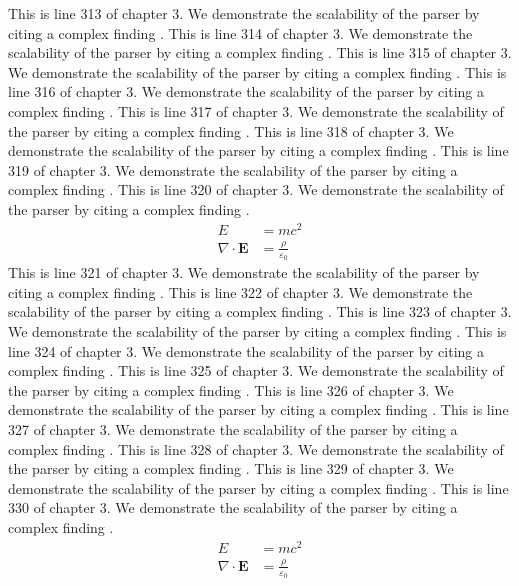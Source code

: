 This is line 313 of chapter 3. We demonstrate the scalability of the parser by citing a complex finding \cite{ref3_313}.
This is line 314 of chapter 3. We demonstrate the scalability of the parser by citing a complex finding \cite{ref3_314}.
This is line 315 of chapter 3. We demonstrate the scalability of the parser by citing a complex finding \cite{ref3_315}.
This is line 316 of chapter 3. We demonstrate the scalability of the parser by citing a complex finding \cite{ref3_316}.
This is line 317 of chapter 3. We demonstrate the scalability of the parser by citing a complex finding \cite{ref3_317}.
This is line 318 of chapter 3. We demonstrate the scalability of the parser by citing a complex finding \cite{ref3_318}.
This is line 319 of chapter 3. We demonstrate the scalability of the parser by citing a complex finding \cite{ref3_319}.
This is line 320 of chapter 3. We demonstrate the scalability of the parser by citing a complex finding \cite{ref3_320}.
\begin{align*}
  E &= mc^2 \\
  \nabla \cdot \mathbf{E} &= \frac{\rho}{\varepsilon_0}
\end{align*}
This is line 321 of chapter 3. We demonstrate the scalability of the parser by citing a complex finding \cite{ref3_321}.
This is line 322 of chapter 3. We demonstrate the scalability of the parser by citing a complex finding \cite{ref3_322}.
This is line 323 of chapter 3. We demonstrate the scalability of the parser by citing a complex finding \cite{ref3_323}.
This is line 324 of chapter 3. We demonstrate the scalability of the parser by citing a complex finding \cite{ref3_324}.
This is line 325 of chapter 3. We demonstrate the scalability of the parser by citing a complex finding \cite{ref3_325}.
This is line 326 of chapter 3. We demonstrate the scalability of the parser by citing a complex finding \cite{ref3_326}.
This is line 327 of chapter 3. We demonstrate the scalability of the parser by citing a complex finding \cite{ref3_327}.
This is line 328 of chapter 3. We demonstrate the scalability of the parser by citing a complex finding \cite{ref3_328}.
This is line 329 of chapter 3. We demonstrate the scalability of the parser by citing a complex finding \cite{ref3_329}.
This is line 330 of chapter 3. We demonstrate the scalability of the parser by citing a complex finding \cite{ref3_330}.
\begin{align*}
  E &= mc^2 \\
  \nabla \cdot \mathbf{E} &= \frac{\rho}{\varepsilon_0}
\end{align*}
